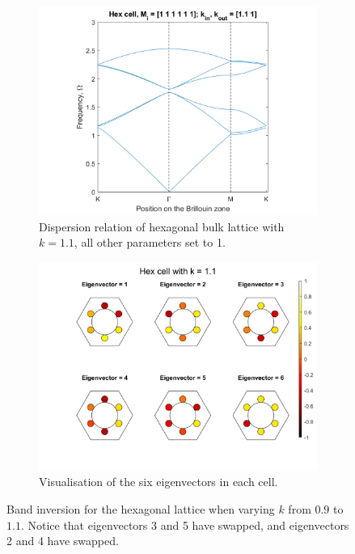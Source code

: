 \begin{figure}
\medskip
\begin{subfigure}[b]{.5\textwidth}
  \centering
  \includegraphics[width=1\linewidth]{imgs/hexinvdispermore.png}
  \caption{Dispersion relation of hexagonal bulk lattice with $k=1.1$, all
other parameters set to 1.}
  \label{fig:sub1}
\end{subfigure}%
\begin{subfigure}[b]{.5\textwidth}
  \centering
  \includegraphics[width=1\linewidth]{imgs/hexinversionmore.png}
  \caption{Visualisation of the six eigenvectors in each cell.}
  \label{fig:sub2}
\end{subfigure}
\caption{Band inversion for the hexagonal lattice when varying $k$ from $0.9$
to $1.1$. Notice that eigenvectors 3 and 5 have swapped, and eigenvectors 2 and
4 have swapped.}
\label{fig:hexinversion}
\end{figure}

